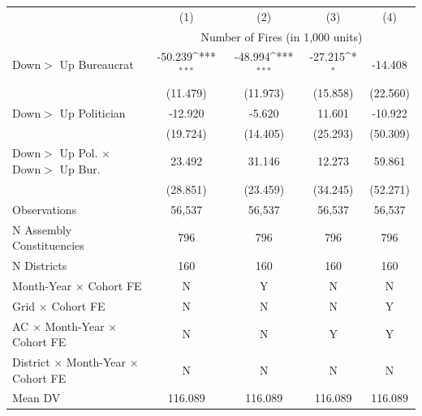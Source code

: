 {\def\sym#1{\ifmmode^{#1}\else\(^{#1}\)\fi}
\begin{tabular}{l*{4}{c}}
\hline
 & (1) & (2) & (3) & (4) \\
 & \multicolumn{4}{c}{Number of Fires (in 1,000 units)} \\ \hline

Down$>$ Up Bureaucrat&     -50.239\sym{***}&     -48.994\sym{***}&     -27.215\sym{*}  &     -14.408         \\
            &    (11.479)         &    (11.973)         &    (15.858)         &    (22.560)         \\
Down$>$ Up Politician&     -12.920         &      -5.620         &      11.601         &     -10.922         \\
            &    (19.724)         &    (14.405)         &    (25.293)         &    (50.309)         \\
Down$>$ Up Pol. $\times$ Down$>$ Up Bur.&      23.492         &      31.146         &      12.273         &      59.861         \\
            &    (28.851)         &    (23.459)         &    (34.245)         &    (52.271)         \\
\hline
Observations&      56,537         &      56,537         &      56,537         &      56,537         \\
N Assembly Constituencies&         796         &         796         &         796         &         796         \\
N Districts &         160         &         160         &         160         &         160         \\
Month-Year $\times$ Cohort FE&           N         &           Y         &           N         &           N         \\
Grid $\times$ Cohort FE&           N         &           N         &           N         &           Y         \\
AC $\times$ Month-Year $\times$ Cohort FE&           N         &           N         &           Y         &           Y         \\
District $\times$ Month-Year $\times$ Cohort FE&           N         &           N         &           N         &           N         \\
Mean DV     &     116.089         &     116.089         &     116.089         &     116.089         \\
\hline
\end{tabular}
}
